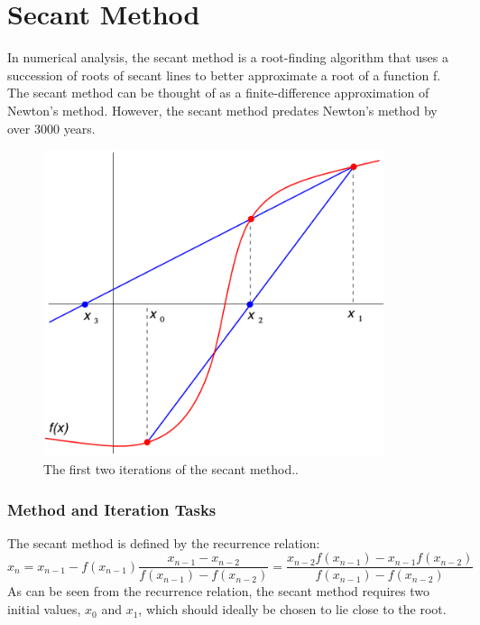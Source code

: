 \documentclass[a4paper, 12pt]{report}
\begin{document}
    \section{Secant Method}
    In numerical analysis, the secant method is a root-finding algorithm that uses a succession of roots of secant lines to better approximate a root of a function f. The secant method can be thought of as a finite-difference approximation of Newton's method. However, the secant method predates Newton's method by over 3000 years.
    \begin{figure}[h]
    \centering
    \includegraphics[width=10cm]{Secant Method.png}
    \caption{The first two iterations of the secant method..}
    \label{fig:SM}
    \end{figure}
    
    \subsubsection{Method and Iteration Tasks}
    The secant method is defined by the recurrence relation:
    \begin{equation}
       x_{n} = x_{n-1} - f(x_{n-1}) \frac{x_{n-1}-x_{n-2}}{f(x_{n-1})-f(x_{n-2})} = \frac{x_{n-2}f(x_{n-1}) - x_{n-1}f(x_{n-2})}{f(x_{n-1})-f(x_{n-2})}
    \end{equation}
    As can be seen from the recurrence relation, the secant method requires two initial values, $x_{0}$ and $x_{1}$, which should ideally be chosen to lie close to the root.
    
\end{document}
